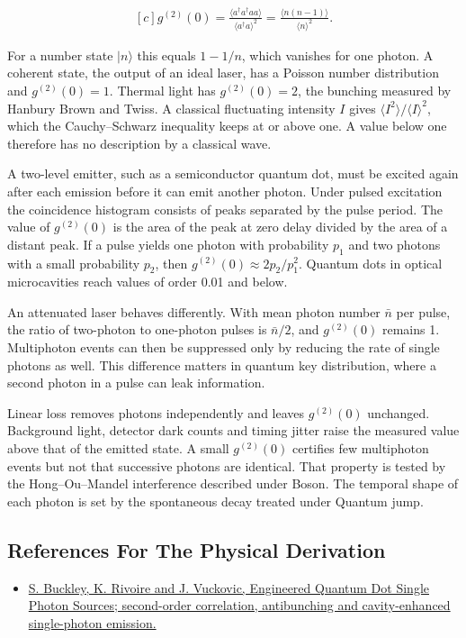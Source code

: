 \documentclass[11pt,oneside]{book}
\newenvironment{centeredalign}{\[\begin{gathered}[c]}{\end{gathered}\]}
\begin{document}
\begin{centeredalign}
g^{(2)}(0)=\frac{\langle a^\dagger a^\dagger aa\rangle}{\langle a^\dagger a\rangle^2}
=\frac{\langle n(n-1)\rangle}{\langle n\rangle^2}.
\end{centeredalign}

For a number state \(|n\rangle\) this equals \(1-1/n\), which vanishes for one photon. A coherent state, the output of an ideal laser, has a Poisson number distribution and \(g^{(2)}(0)=1\). Thermal light has \(g^{(2)}(0)=2\), the bunching measured by Hanbury Brown and Twiss. A classical fluctuating intensity \(I\) gives \(\langle I^2\rangle/\langle I\rangle^2\), which the Cauchy--Schwarz inequality keeps at or above one. A value below one therefore has no description by a classical wave.

A two-level emitter, such as a semiconductor quantum dot, must be excited again after each emission before it can emit another photon. Under pulsed excitation the coincidence histogram consists of peaks separated by the pulse period. The value of \(g^{(2)}(0)\) is the area of the peak at zero delay divided by the area of a distant peak. If a pulse yields one photon with probability \(p_1\) and two photons with a small probability \(p_2\), then \(g^{(2)}(0)\approx2p_2/p_1^2\). Quantum dots in optical microcavities reach values of order 0.01 and below.

An attenuated laser behaves differently. With mean photon number \(\bar n\) per pulse, the ratio of two-photon to one-photon pulses is \(\bar n/2\), and \(g^{(2)}(0)\) remains 1. Multiphoton events can then be suppressed only by reducing the rate of single photons as well. This difference matters in quantum key distribution, where a second photon in a pulse can leak information.

Linear loss removes photons independently and leaves \(g^{(2)}(0)\) unchanged. Background light, detector dark counts and timing jitter raise the measured value above that of the emitted state. A small \(g^{(2)}(0)\) certifies few multiphoton events but not that successive photons are identical. That property is tested by the Hong--Ou--Mandel interference described under Boson. The temporal shape of each photon is set by the spontaneous decay treated under Quantum jump.

\subsection*{References For The Physical Derivation}
\begin{itemize}
\item \href{https://arxiv.org/abs/1210.1234}{S. Buckley, K. Rivoire and J. Vuckovic, Engineered Quantum Dot Single Photon Sources; second-order correlation, antibunching and cavity-enhanced single-photon emission.}
\end{itemize}
\end{document}
